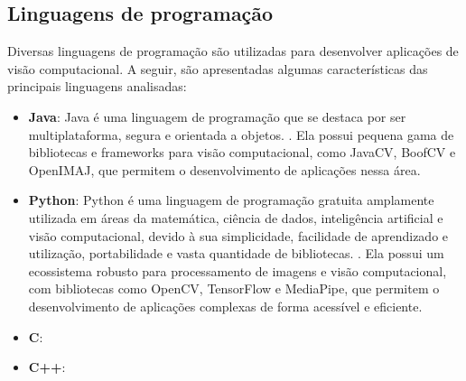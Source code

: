 \subsection{Linguagens de programação}
Diversas linguagens de programação são utilizadas para desenvolver aplicações de visão computacional. A seguir, são apresentadas algumas características das principais linguagens analisadas:
\begin{itemize}
    \item \textbf{Java}: Java é uma linguagem de programação que se destaca por ser multiplataforma, segura e orientada a objetos. \cite{Schildt2019}. Ela possui pequena gama de bibliotecas e frameworks para visão computacional, como JavaCV, BoofCV e OpenIMAJ, que permitem o desenvolvimento de aplicações nessa área.
    \item \textbf{Python}: Python é uma linguagem de programação gratuita amplamente utilizada em áreas da matemática, ciência de dados, inteligência artificial e visão computacional, devido à sua simplicidade, facilidade de aprendizado e utilização, portabilidade e vasta quantidade de bibliotecas. \cite{Lutz1999}. Ela possui um ecossistema robusto para processamento de imagens e visão computacional, com bibliotecas como OpenCV, TensorFlow e MediaPipe, que permitem o desenvolvimento de aplicações complexas de forma acessível e eficiente.
    \item \textbf{C}: 
    \item \textbf{C++}: 
\end{itemize}

